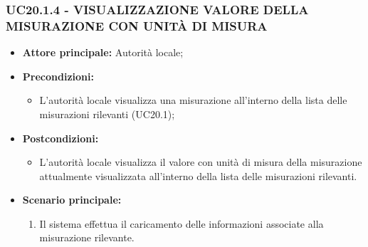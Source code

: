 \subsubsection{UC20.1.4 - VISUALIZZAZIONE VALORE DELLA MISURAZIONE CON UNITÀ DI MISURA}
\begin{itemize}
    \item \textbf{Attore principale:} Autorità locale;
    \item \textbf{Precondizioni:}
        \begin{itemize}
                \item L'autorità locale visualizza una misurazione all'interno della lista delle misurazioni rilevanti (UC20.1);
        \end{itemize}
    \item \textbf{Postcondizioni:}
        \begin{itemize}
            \item L'autorità locale visualizza il valore con unità di misura della misurazione attualmente visualizzata all'interno della lista delle misurazioni rilevanti.
        \end{itemize}
    \item \textbf{Scenario principale:}
        \begin{enumerate}
            \item Il sistema effettua il caricamento delle informazioni associate alla misurazione rilevante.
        \end{enumerate}
\end{itemize}